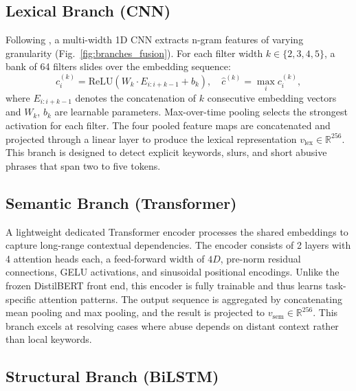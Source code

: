 \documentclass[10pt,twocolumn,a4paper]{article}
\begin{document}
\subsection{Lexical Branch (CNN)}\label{subsec:cnn}

Following \citet{ref7}, a multi-width 1D CNN extracts n-gram features of varying granularity (Fig.~\ref{fig:branches_fusion}). For each filter width $k \in \{2,3,4,5\}$, a bank of 64 filters slides over the embedding sequence:
\begin{equation}
c_i^{(k)} = \mathrm{ReLU}(W_k \cdot E_{i:i+k-1} + b_k), \quad
\hat{c}^{(k)} = \max_i c_i^{(k)},
\label{eq:cnn_bias}
\end{equation}
where $E_{i:i+k-1}$ denotes the concatenation of $k$ consecutive embedding vectors and $W_k$, $b_k$ are learnable parameters. Max-over-time pooling selects the strongest activation for each filter. The four pooled feature maps are concatenated and projected through a linear layer to produce the lexical representation $v_{\mathrm{lex}} \in \mathbb{R}^{256}$. This branch is designed to detect explicit keywords, slurs, and short abusive phrases that span two to five tokens.

\subsection{Semantic Branch (Transformer)}\label{subsec:transformer}

A lightweight dedicated Transformer encoder processes the shared embeddings to capture long-range contextual dependencies. The encoder consists of 2 layers with 4 attention heads each, a feed-forward width of $4D$, pre-norm residual connections, GELU activations, and sinusoidal positional encodings. Unlike the frozen DistilBERT front end, this encoder is fully trainable and thus learns task-specific attention patterns. The output sequence is aggregated by concatenating mean pooling and max pooling, and the result is projected to $v_{\mathrm{sem}} \in \mathbb{R}^{256}$. This branch excels at resolving cases where abuse depends on distant context rather than local keywords.

\subsection{Structural Branch (BiLSTM)}\label{subsec:bilstm}
\end{document}

